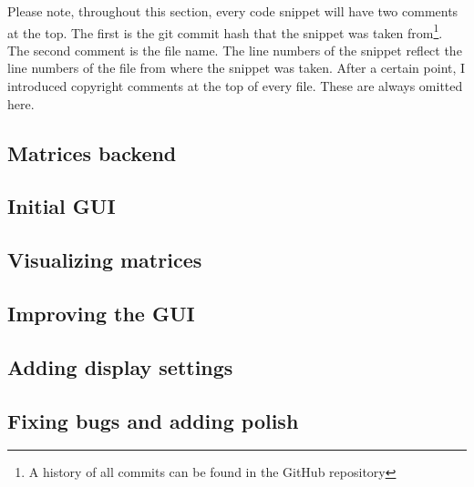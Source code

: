 \documentclass[../main.tex]{subfiles}
\begin{document}
Please note, throughout this section, every code snippet will have two comments at the top. The first is the git commit hash that the snippet was taken from\footnote{A history of all commits can be found in the GitHub repository\cite{lintrans-github}}. The second comment is the file name. The line numbers of the snippet reflect the line numbers of the file from where the snippet was taken. After a certain point, I introduced copyright comments at the top of every file. These are always omitted here.

\subsection{Matrices backend\label{development:matrices-backend}}


\newpage

\subsection{Initial GUI\label{development:initial-gui}}


\newpage

\subsection{Visualizing matrices\label{development:visualizing-matrices}}


\newpage

\subsection{Improving the GUI\label{development:improving-the-gui}}


\newpage

\subsection{Adding display settings\label{development:adding-display-settings}}


\newpage

\subsection{Fixing bugs and adding polish\label{development:fixing-bugs-and-adding-polish}}

\end{document}
